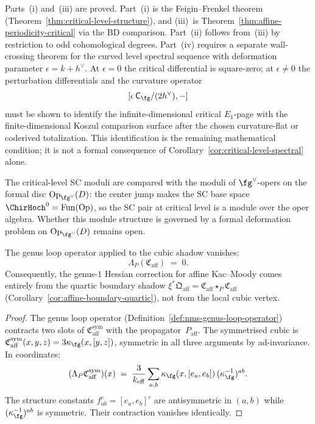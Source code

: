 \begin{remark}
\label{rem:sc-deformation-critical-obligation}
Parts~(i) and~(iii) are proved.  Part~(i) is the Feigin--Frenkel theorem
(Theorem~\ref{thm:critical-level-structure}),
and (iii)~is Theorem~\ref{thm:affine-periodicity-critical}
via the BD comparison.
Part~(ii) follows from~(iii) by restriction to odd
cohomological degrees.
Part~(iv) requires a separate wall-crossing theorem for the curved
level spectral sequence with deformation parameter
\(\epsilon=k+h^\vee\).  At \(\epsilon=0\) the critical differential
is square-zero; at \(\epsilon\neq0\) the perturbation differentials
and the curvature operator
\[
[\epsilon\,\mathsf C_{\fg}/(2h^\vee),-]
\]
must be shown to identify the infinite-dimensional critical
\(E_1\)-page with the finite-dimensional Koszul comparison surface
after the chosen curvature-flat or coderived totalization.  This
identification is the remaining mathematical condition; it is not a formal
consequence of Corollary~\ref{cor:critical-level-spectral} alone.

The critical-level SC moduli are compared with the moduli of
$\fg^\vee$-opers on the formal disc
$\mathrm{Op}_{\fg^\vee}(D)$:
the center jump makes the SC base space
$\ChirHoch^0 = \mathrm{Fun}(\mathrm{Op})$,
so the SC pair at critical level is a module over the oper algebra.
Whether this module structure is governed by a formal deformation
problem on $\mathrm{Op}_{\fg^\vee}(D)$ remains open.
\end{remark}

\begin{theorem}\label{thm:affine-genus-loop-weyl}
The genus loop operator applied to the cubic shadow vanishes:
\begin{equation}\label{eq:affine-genus-loop-weyl}
\Lambda_P(\mathfrak{C}_{\mathrm{aff}}) \;=\; 0.
\end{equation}
Consequently, the genus-$1$ Hessian correction for affine
Kac--Moody comes entirely from the quartic boundary shadow
$\xi^*\mathfrak{Q}_{\mathrm{aff}}
= \mathfrak{C}_{\mathrm{aff}} \star_P \mathfrak{C}_{\mathrm{aff}}$
\textup{(}Corollary~\textup{\ref{cor:affine-boundary-quartic})},
not from the local cubic vertex.
\end{theorem}

\begin{proof}
The genus loop operator
\textup{(Definition~\textup{\ref{def:nms-genus-loop-operator}})}
contracts two slots of $\mathfrak{C}_{\mathrm{aff}}^{\mathrm{sym}}$
with the propagator~$P_{\mathrm{aff}}$. The symmetrised cubic is
$\mathfrak{C}_{\mathrm{aff}}^{\mathrm{sym}}(x,y,z)
= 3\kappa_{\fg}(x,[y,z])$, symmetric in all three arguments by
ad-invariance. In coordinates:
\[
(\Lambda_P \mathfrak{C}_{\mathrm{aff}}^{\mathrm{sym}})(x)
\;=\;
\frac{3}{k_{\mathrm{eff}}}
\sum_{a,b} \kappa_{\fg}(x,[e_a,e_b])\,(\kappa_{\fg}^{-1})^{ab}.
\]
The structure constants $f^c_{ab} = [e_a,e_b]^c$ are
antisymmetric in $(a,b)$ while $(\kappa_{\fg}^{-1})^{ab}$ is
symmetric. Their contraction vanishes identically.
\end{proof}

